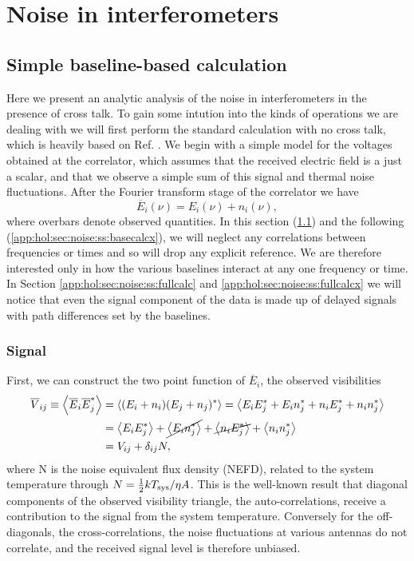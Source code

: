 \section{Noise in interferometers}
\label{app:hol:sec:noise}

\subsection{Simple baseline-based calculation} 
\label{app:hol:sec:noise:ss:basecalc}

Here we present an analytic analysis of the noise in interferometers in the presence of cross talk. To gain some intution into the kinds of operations we are dealing with we will first perform the standard calculation with no cross talk, which is heavily based on Ref. \citep{kulkarni}. We begin with a simple model for the voltages obtained at the correlator, which assumes that the received electric field is a just a scalar, and that we observe a simple sum of this signal and thermal noise fluctuations. After the Fourier transform stage of the correlator we have
\begin{equation}
\overline{E}_i(\nu) = E_i(\nu)+ n_i(\nu),
\end{equation}
where overbars denote observed quantities. In this section (\ref{app:hol:sec:noise:ss:basecalc}) and the following (\ref{app:hol:sec:noise:ss:basecalcx}), we will neglect any correlations between frequencies or times and so will drop any explicit reference. We are therefore interested only in how the various baselines interact at any one frequency or time. In Section \ref{app:hol:sec:noise:ss:fullcalc} and \ref{app:hol:sec:noise:ss:fullcalcx} we will notice that even the signal component of the data is made up of delayed signals with path differences set by the baselines.
\subsubsection{Signal}
First, we can construct the two point function of $\overline{E}_i$, the observed visibilities
\begin{align}
\overline{V}_{ij} \equiv \left\langle \overline{E}_i \overline{E}_j^* \right\rangle &= \left\langle (E_i + n_i)(E_j + n_j)^* \right\rangle = \left\langle E_iE_j^* + E_in_j^* + n_iE_j^* + n_in_j^*\right\rangle \nonumber \\ 
&= \left\langle E_iE_j^* \right\rangle + \cancel{\left\langle E_in_j^* \right\rangle} + \cancel{\left\langle n_iE_j^*\right\rangle} +\left\langle n_in_j^* \right\rangle
\nonumber \\ 
&= V_{ij} + \delta_{ij} N, \label{obsvis}
\end{align}
where N is the noise equivalent flux density (NEFD), related to the system temperature through $N=\frac{1}{2}kT_{\rm sys} / \eta A$. This is the well-known result that diagonal components of the observed visibility triangle, the auto-correlations, receive a contribution to the signal from the system temperature. Conversely for the off-diagonals, the cross-correlations, the noise fluctuations at various antennas do not correlate, and the received signal level is therefore unbiased.
